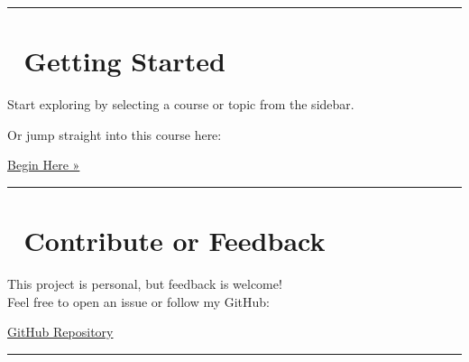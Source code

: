 \documentclass[
  letterpaper,
  DIV=11,
  numbers=noendperiod]{scrreprt}
\begin{document}
\begin{center}\rule{0.5\linewidth}{0.5pt}\end{center}

\section*{🚀 Getting Started}\label{getting-started}


\begin{tcolorbox}[enhanced jigsaw, colframe=quarto-callout-tip-color-frame, toprule=.15mm, bottomrule=.15mm, rightrule=.15mm, colback=white, breakable, arc=.35mm, opacityback=0, left=2mm, leftrule=.75mm]
\begin{minipage}[t]{5.5mm}
\textcolor{quarto-callout-tip-color}{\faLightbulb}
\end{minipage}%
\begin{minipage}[t]{\textwidth - 5.5mm}

Start exploring by selecting a course or topic from the sidebar.

Or jump straight into this course here:

\end{minipage}%
\end{tcolorbox}

\href{courseD421.qmd}{Begin Here »}

\begin{center}\rule{0.5\linewidth}{0.5pt}\end{center}

\section*{🙌 Contribute or Feedback}\label{contribute-or-feedback}


This project is personal, but feedback is welcome!\\
Feel free to open an issue or follow my GitHub:

\href{https://github.com/MarcellaHarr/study-guides-and-notes}{GitHub
Repository}

\begin{center}\rule{0.5\linewidth}{0.5pt}\end{center}

\end{document}

